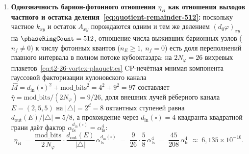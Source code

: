 \begin{corollary}[Единство природы и количества заряда: частное и остаток одного деления на $\phaseRingCount = 512$]
\begin{enumerate}[label=(\roman*)]
  Из~\eqref{eq:explicit-plaquette-law-of-motion} следует, что пока на рёбрах $e\in\partial f$ треугольная сумма градиентов ворот не пересекает нечётное кратное противофазного порога $(2m+1)\Phi_{\mathrm{Pauli}}$, заряд плакета строго постоянен ($\Delta_t n_f(t) = 0$). В момент переброса $\Delta_t k_e(t) = \pm 1$ на общем ребре $e = f_+\cap f_-$ двух граней заряд меняется одновременно на двух гранях ($\Delta_t n_{f_+} = \mp 1$, $\Delta_t n_{f_-} = \pm 1$), реализуя ровно три элементарных процесса кинематики материи: рождение дипольной пары $(0,0)\mapsto(+1,-1)$, перешагивание вихревой нити на соседнюю грань $(\pm 1,0)\mapsto(0,\pm 1)$ и аннигиляцию пары $(+1,-1)\mapsto(0,0)$ в излучение~$A_e$.
\item \textbf{Однозначность барион-фотонного отношения $\eta_B$ как отношения выходов частного и остатка деления~\eqref{eq:quotient-remainder-512}:}
  поскольку частное $k_{xy}$ и остаток $A_{xy}$ порождаются одним и тем же делением $(d_0\varphi)_{xy}$ на $\phaseRingCount=512$,
  отношение числа выживших барионных узлов ($n_f\ne 0$) к числу фотонных квантов ($n_E\ge 1,\ n_f=0$) есть доля
  переполнений главного интервала в полном потоке кубооктаэдра: на $2N_\varphi = 26$ вихревых плакетов~\eqref{eq:t2-26-vortex-plaquettes}
  CP-нечётная мнимая компонента гауссовой факторизации кулоновского канала $\hat M = d_{\mathrm{in}}(\square)^2 + \mathrm{mod\_bits}^2 = 4^2+9^2 = 97$
  составляет $\bar\eta = \mathrm{mod\_bits}/(2N_\varphi) = 9/26$, доля внешних лучей рёберного канала $E=(2,5,5)$
  на $|\triangle|=2^d=8$ октантных ступеней равна $d_{\mathrm{out}}(E)/|\triangle| = 5/8$, а прохождение через
  $d_{\mathrm{in}}(\square)=4$ квадранта квадратной грани даёт фактор $\alpha_{\mathrm{fs}}^{d_{\mathrm{in}}(\square)}=\alpha_{\mathrm{fs}}^4$:
  \begin{equation}
  \label{eq:eta-b-from-quotient-remainder}
    \eta_B \;=\; \frac{\mathrm{mod\_bits}}{2\,N_\varphi}\cdot\frac{d_{\mathrm{out}}(E)}{|\triangle|}\,\alpha_{\mathrm{fs}}^{d_{\mathrm{in}}(\square)}
    \;=\; \frac{9}{26}\cdot\frac{5}{8}\,\alpha_{\mathrm{fs}}^4
    \;=\; \frac{45}{208}\,\alpha_{\mathrm{fs}}^4 \;\approx\; 6{,}135\times 10^{-10}.
  \end{equation}
\end{enumerate}
\end{corollary}

